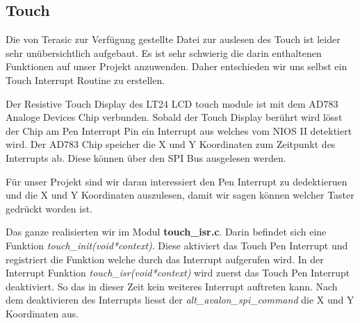 \subsection{Touch}\label{subsec:touch}
 Die von Terasic zur Verfügung gestellte Datei zur auslesen des Touch ist leider sehr unübersichtlich aufgebaut. Es ist sehr schwierig die darin enthaltenen Funktionen auf unser Projekt anzuwenden. Daher entschieden wir uns selbst ein Touch Interrupt Routine zu erstellen. 
 
 Der Resistive Touch Display des LT24 LCD touch module ist mit dem AD783 Analoge Devices Chip verbunden. Sobald der Touch Display berührt wird lösst der Chip am Pen Interrupt Pin ein Interrupt aus welches vom NIOS II detektiert wird. Der AD783 Chip speicher die X und Y Koordinaten zum Zeitpunkt des Interrupts ab. Diese können über den SPI Bus ausgelesen werden. 
 
 Für unser Projekt sind wir daran interessiert den Pen Interrupt zu dedektieruen und die X und Y Koordinaten auszulesen, damit wir sagen können welcher Taster gedrückt worden ist.
 
Das ganze realisierten wir im Modul \textbf{touch\_isr.c}. Darin befindet sich eine Funktion \textit{touch\_init(void*context)}. Diese aktiviert das Touch Pen Interrupt  und registriert die Funktion welche durch das Interrupt aufgerufen wird. 
In der Interrupt Funktion \textit{touch\_isr(void*context)} wird zuerst das Touch Pen Interrupt  deaktiviert. So das in dieser Zeit kein weiteres Interrupt auftreten kann. Nach dem deaktivieren des Interrupts liesst der \textit{alt\_avalon\_spi\_command} die X und Y Koordinaten aus.